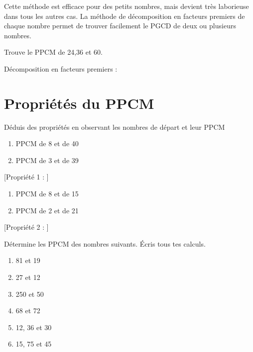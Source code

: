 \documentclass[../../syllabus_2.tex]{subfiles}
\begin{document}
Cette méthode est efficace pour des petits nombres, mais devient très laborieuse dans tous les autres cas. La méthode de décomposition en facteurs premiers de chaque nombre permet de trouver facilement le PGCD de deux ou plusieurs nombres. 

\exemple Trouve le PPCM de 24,36 et 60.

Décomposition en facteurs premiers : 

\newpage

\section{Propriétés du PPCM}

Déduis des propriétés en observant les nombres de départ et leur PPCM

\begin{enumerate}[cols=2]
    \item PPCM de 8 et de 40
    \item PPCM de 3 et de 39
\end{enumerate}
\vfill
{}[Propriété 1 : ]

\begin{enumerate}[cols=2]
    \item PPCM de 8 et de 15
    \item PPCM de 2 et de 21
\end{enumerate}
\vfill
{}[Propriété 2 : ]

\newpage

\begin{exercise}
    Détermine les PPCM des nombres suivants. Écris tous tes calculs.
    \begin{enumerate}[cols=2, itemsep=.3\textheight]
        \item 81 et 19
        \item 27 et 12
        \item 250 et 50
        \item 68 et 72
        \item 12, 36 et 30
        \item 15, 75 et 45
    \end{enumerate}
\end{exercise}

\newpage
\end{document}

